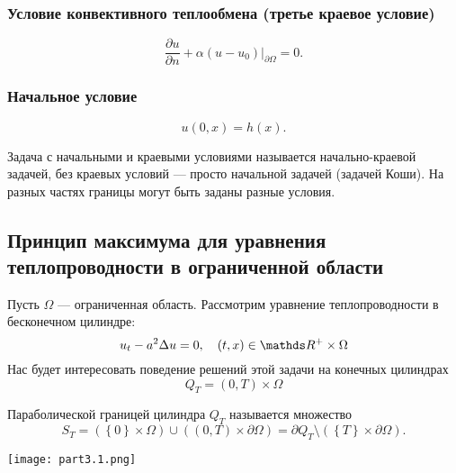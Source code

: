 \subsubsection{Условие конвективного теплообмена (третье краевое условие)}
$$ \frac {\partial u} {\partial n} + \alpha (u - u_0) \Bigg\rvert_{\partial \Omega} = 0.$$

\subsubsection{Начальное условие}
$$ u(0, x) = h(x).$$


Задача с начальными и краевыми условиями называется начально-краевой задачей, без краевых условий --- просто начальной задачей (задачей Коши). На разных частях границы могут быть заданы разные условия.

\subsection{Принцип максимума для уравнения теплопроводности в ограниченной области}
Пусть $\Omega$ --- ограниченная область. Рассмотрим уравнение теплопроводности в бесконечном цилиндре: $$ u_t - a^2 \Delta u = 0, \quad  (t,x) \in \real^+ \times \Omega$$
Нас будет интересовать поведение решений этой задачи на конечных цилиндрах $$ Q_T = (0, T) \times \Omega $$

\begin{definition}
Параболической границей цилиндра $Q_T$ называется множество
$$ S_T = (\left\{ 0 \right\} \times \Omega) \cup ((0,T) \times \partial \Omega) = \partial Q_T \setminus (\left\{ T \right\} \times \partial \Omega) .$$
\end{definition}

\begin{center}
\texttt{[image: part3.1.png]}
\end{center}

